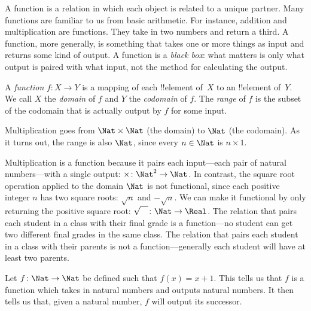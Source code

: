 \documentclass[../../../include/open-logic-section]{subfiles}
\begin{document}

\begin{explain}
A function is a relation in which each object is related to a unique
partner. Many functions are familiar to us from basic arithmetic. For
instance, addition and multiplication are functions. They take in two
numbers and return a third. A function, more generally, is something
that takes one or more things as input and returns some kind of
output. A function is a \emph{black box}: what matters is only what
output is paired with what input, not the method for calculating the
output.
\end{explain}

\begin{defn}
A \emph{function} $f \colon X \to Y$ is a mapping of each !!{element}
of~$X$ to an !!{element} of~$Y$. We call $X$ the \emph{domain} of $f$
and $Y$ the \emph{codomain} of $f$. The \emph{range} of $f$ is the
subset of the codomain that is actually output by $f$ for some input.
\end{defn}

\begin{ex}
Multiplication goes from $\Nat \times \Nat$ (the domain) to $\Nat$
(the codomain). As it turns out, the range is also $\Nat$, since every
$n \in \Nat$ is $n \times 1$.
\end{ex}

\begin{explain}
Multiplication is a function because it pairs each input---each pair
of natural numbers---with a single output: $\times \colon \Nat^2 \to
\Nat$. In contrast, the square root operation applied to the domain
$\Nat$ is not functional, since each positive integer $n$ has two
square roots: $\sqrt{n}$ and $-\sqrt{n}$. We can make it functional by
only returning the positive square root: $\sqrt{\phantom{X}} \colon
\Nat \to \Real$. The relation that pairs each student in a class with
their final grade is a function---no student can get two different
final grades in the same class. The relation that pairs each student
in a class with their parents is not a function---generally each
student will have at least two parents.
\end{explain}

\begin{ex}
Let $f \colon \Nat \to \Nat$ be defined such that $f(x) = x+1$. This
tells us that $f$ is a function which takes in natural numbers and
outputs natural numbers. It then tells us that, given a natural
number, $f$ will output its successor.
\end{ex}
\end{document}

